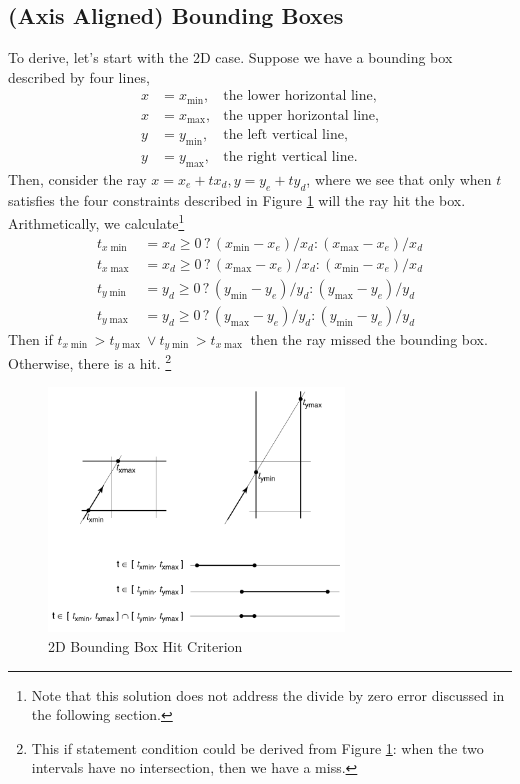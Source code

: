 \documentclass[11pt]{article}
\begin{document}
\subsection{(Axis Aligned) Bounding Boxes}
To derive, let's start with the 2D case. Suppose we have a bounding box described by four lines, 
\begin{align}
	x &= x_{\min}, &\text{the lower horizontal line}, \\
	x &= x_{\max}, &\text{the upper horizontal line}, \\
	y &= y_{\min}, &\text{the left vertical line}, \\
	y &= y_{\max}, &\text{the right vertical line}. 
\end{align}
Then, consider the ray $x = x_e + tx_d, y = y_e + ty_d$, where we see that only when $t$ satisfies the four constraints described in Figure \ref{bbt} will the ray hit the box. Arithmetically, we calculate\footnote{Note that this solution does not address the divide by zero error discussed in the following section. }
\begin{align}
	t_{x\min} &= x_d \geq 0 \,?\, (x_{\min} - x_e) / x_d : (x_{\max} - x_e) / x_d \\
	t_{x\max} &= x_d \geq 0 \,?\, (x_{\max} - x_e) / x_d : (x_{\min} - x_e) / x_d \\
	t_{y\min} &= y_d \geq 0 \,?\, (y_{\min} - y_e) / y_d : (y_{\max} - y_e) / y_d \\
	t_{y\max} &= y_d \geq 0 \,?\, (y_{\max} - y_e) / y_d : (y_{\min} - y_e) / y_d
\end{align}
Then if $t_{x\min} > t_{y\max} \lor  t_{y\min} > t_{x\max} $ then the ray missed the bounding box. Otherwise, there is a hit. \footnote{This if statement condition could be derived from Figure \ref{bbt}: when the two intervals have no intersection, then we have a miss. }

\begin{figure}
	\center\includegraphics[width=0.7\textwidth]{figs/bounding box solve t}
	\caption{\label{bbt}2D Bounding Box Hit Criterion}
\end{figure}
\end{document}
